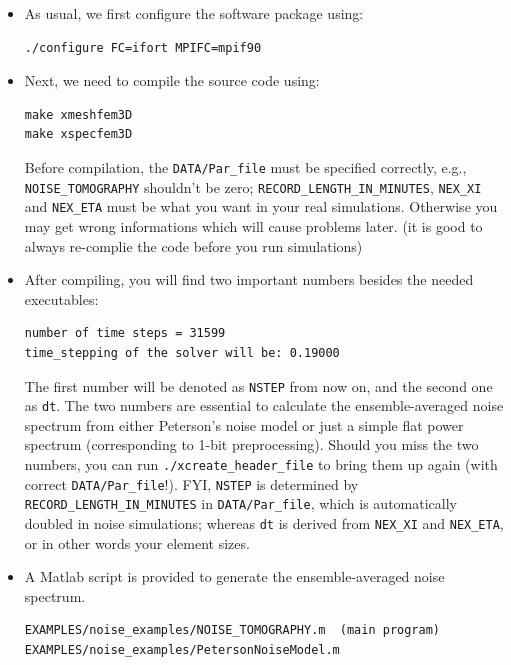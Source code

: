 \begin{itemize}

\item
As usual, we first configure the software package using:
\begin{verbatim}
./configure FC=ifort MPIFC=mpif90
\end{verbatim}

\item
Next, we need to compile the source code using:
\begin{verbatim}
make xmeshfem3D
make xspecfem3D
\end{verbatim}

Before compilation, the \texttt{DATA/Par\_file} must be specified correctly, e.g.,
\texttt{NOISE\_TOMOGRAPHY} shouldn't be zero; \texttt{RECORD\_LENGTH\_IN\_MINUTES},
\texttt{NEX\_XI} and \texttt{NEX\_ETA} must be what you want in your real simulations.
Otherwise you may get wrong informations which will cause problems later.
(it is good to always re-complie the code before you run simulations)\newline

\item
After compiling, you will find two important numbers besides the needed executables:
\begin{verbatim}
number of time steps = 31599
time_stepping of the solver will be: 0.19000
\end{verbatim}

The first number will be denoted as \texttt{NSTEP} from now on, and the second one as \texttt{dt}.
The two numbers are essential to calculate the ensemble-averaged noise spectrum from either Peterson's noise
model or just a simple flat power spectrum (corresponding to 1-bit preprocessing).
Should you miss the two numbers, you can run
\texttt{./xcreate\_header\_file} to bring them up again (with correct \texttt{DATA/Par\_file}!).
FYI, \texttt{NSTEP} is determined by \texttt{RECORD\_LENGTH\_IN\_MINUTES} in \texttt{DATA/Par\_file},
which is automatically doubled in noise simulations; whereas \texttt{dt} is derived from
\texttt{NEX\_XI} and \texttt{NEX\_ETA}, or in other words your element sizes.


\item
A Matlab script is provided to generate the ensemble-averaged noise spectrum.
\begin{verbatim}
EXAMPLES/noise_examples/NOISE_TOMOGRAPHY.m  (main program)
EXAMPLES/noise_examples/PetersonNoiseModel.m
\end{verbatim}


\end{itemize}
